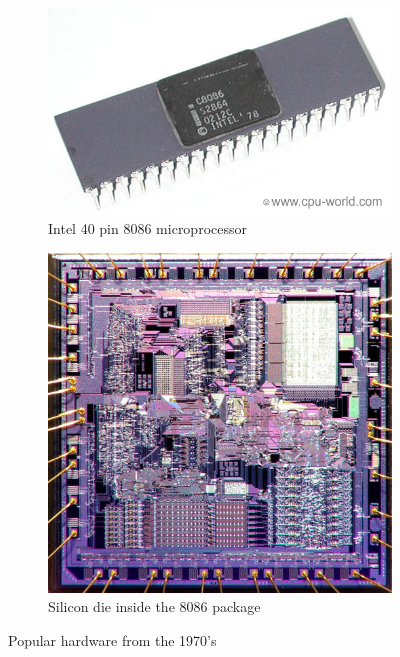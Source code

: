 \documentclass[pdftex,10.5pt]{report}
\begin{document}
\begin{figure}[h]
	\centering
	\begin{subfigure}[H]{0.4\textwidth}
		\includegraphics[width=\textwidth]{figures/intel8086}
		\caption{Intel 40 pin 8086 microprocessor}
	\end{subfigure}
	\begin{subfigure}[H]{0.4\textwidth}
		\includegraphics[width=\textwidth]{figures/8086die}
		\caption{Silicon die inside the 8086 package}
	\end{subfigure}
	\caption{Popular hardware from the 1970's
	}
	\label{fig:intel8086}
\end{figure}
\end{document}
